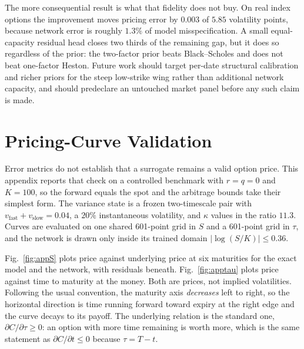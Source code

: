 \documentclass[conference]{IEEEtran}
\begin{document}
The more consequential result is what that fidelity does not buy. On real
index options the improvement moves pricing error by $0.003$ of $5.85$
volatility points, because network error is roughly $1.3\%$ of model
misspecification. A small equal-capacity residual head closes two thirds of the
remaining gap, but it does so regardless of the prior: the two-factor prior
beats Black--Scholes and does not beat one-factor Heston. Future work should
target per-date structural calibration and richer priors for the steep
low-strike wing rather than additional network capacity, and should predeclare
an untouched market panel before any such claim is made.

\appendices

\section{Pricing-Curve Validation}
\label{app:curves}

Error metrics do not establish that a surrogate remains a valid option price.
This appendix reports that check on a controlled benchmark with $r=q=0$ and
$K=100$, so the forward equals the spot and the arbitrage bounds take their
simplest form. The variance state is a frozen two-timescale pair with
$v_{\text{fast}}+v_{\text{slow}}=0.04$, a $20\%$ instantaneous volatility, and
$\kappa$ values in the ratio $11.3$. Curves are evaluated on one shared
601-point grid in $S$ and a 601-point grid in $\tau$, and the network is drawn
only inside its trained domain $|\log(S/K)|\le0.36$.

Fig.~\ref{fig:appS} plots price against underlying price at six maturities for
the exact model and the network, with residuals beneath.
Fig.~\ref{fig:apptau} plots price against time to maturity at the money. Both
are prices, not implied volatilities. Following the usual convention, the
maturity axis \emph{decreases} left to right, so the horizontal direction is
time running forward toward expiry at the right edge and the curve decays to
its payoff. The underlying relation is the standard one,
$\partial C/\partial\tau\ge0$: an option with more time remaining is worth
more, which is the same statement as $\partial C/\partial t\le0$ because
$\tau=T-t$.
\end{document}
